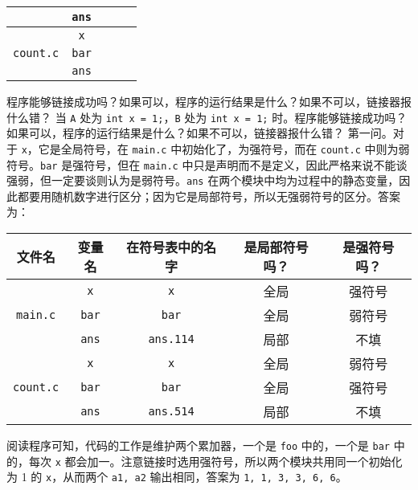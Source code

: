 \begin{problems}
\begin{table}[H]
\begin{tabular}{|c|c|c|c|c|}
                & \texttt{ans} &  &  &  \\ \hline
                \multirow{3}{*}{\texttt{count.c}} & \texttt{x} &  &  &  \\ \cline{2-5} 
                & \texttt{bar} &  &  &  \\ \cline{2-5} 
                & \texttt{ans} &  &  &  \\ \hline
            \end{tabular}
        \end{table}
        程序能够链接成功吗？如果可以，程序的运行结果是什么？如果不可以，链接器报什么错？
        \qn 当 \verb|A| 处为 \verb|int x = 1;|，\verb|B| 处为 \verb|int x = 1;| 时。程序能够链接成功吗？如果可以，程序的运行结果是什么？如果不可以，链接器报什么错？
        \sol 第一问。对于 \verb|x|，它是全局符号，在 \verb|main.c| 中初始化了，为强符号，而在 \verb|count.c| 中则为弱符号。\verb|bar| 是强符号，但在 \verb|main.c| 中只是声明而不是定义，因此严格来说不能谈强弱，但一定要谈则认为是弱符号。\verb|ans| 在两个模块中均为过程中的静态变量，因此都要用随机数字进行区分；因为它是局部符号，所以无强弱符号的区分。答案为：
        \begin{table}[H]
            \centering
            \begin{tabular}{|c|c|c|c|c|}
                \hline
                文件名 & 变量名 & 在符号表中的名字 & 是局部符号吗？ & 是强符号吗？ \\ \hline
                \multirow{3}{*}{\texttt{main.c}} & \texttt{x} & \verb|x| & 全局 & 强符号 \\ \cline{2-5} 
                & \texttt{bar} & \verb|bar| & 全局 & 弱符号 \\ \cline{2-5} 
                & \texttt{ans} & \verb|ans.114| & 局部 & 不填 \\ \hline
                \multirow{3}{*}{\texttt{count.c}} & \texttt{x} & \verb|x| & 全局 & 弱符号 \\ \cline{2-5} 
                & \texttt{bar} & \verb|bar| & 全局 & 强符号 \\ \cline{2-5} 
                & \texttt{ans} & \verb|ans.514| & 局部 & 不填 \\ \hline
            \end{tabular}
        \end{table}
        阅读程序可知，代码的工作是维护两个累加器，一个是 \verb|foo| 中的，一个是 \verb|bar| 中的，每次 \verb|x| 都会加一。注意链接时选用强符号，所以两个模块共用同一个初始化为 1 的 \verb|x|，从而两个 \verb|a1, a2| 输出相同，答案为 \verb|1, 1, 3, 3, 6, 6|。


\end{problems}
